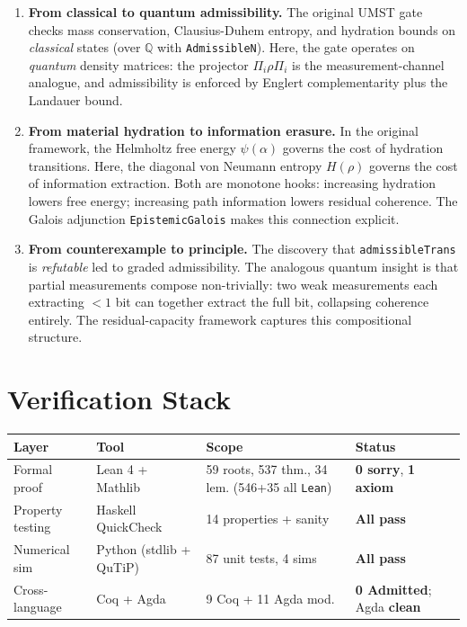 \documentclass[11pt, a4paper]{article}
\begin{document}
\begin{enumerate}
\item \textbf{From classical to quantum admissibility.} The original UMST gate checks mass conservation, Clausius-Duhem entropy, and hydration bounds on \emph{classical} states (over $\mathbb{Q}$ with \texttt{AdmissibleN}). Here, the gate operates on \emph{quantum} density matrices: the projector $\Pi_i \rho \Pi_i$ is the measurement-channel analogue, and admissibility is enforced by Englert complementarity plus the Landauer bound.

\item \textbf{From material hydration to information erasure.} In the original framework, the Helmholtz free energy $\psi(\alpha)$ governs the cost of hydration transitions. Here, the diagonal von Neumann entropy $H(\rho)$ governs the cost of information extraction. Both are monotone hooks: increasing hydration lowers free energy; increasing path information lowers residual coherence. The Galois adjunction \texttt{EpistemicGalois} makes this connection explicit.

\item \textbf{From counterexample to principle.} The discovery that \texttt{admissibleTrans} is \emph{refutable} led to graded admissibility. The analogous quantum insight is that partial measurements compose non-trivially: two weak measurements each extracting $< 1$ bit can together extract the full bit, collapsing coherence entirely. The residual-capacity framework captures this compositional structure.
\end{enumerate}

\section{Verification Stack}

\vspace{0.2em}
{\small
\begin{tabular}{@{}llll@{}}
\toprule
\textbf{Layer} & \textbf{Tool} & \textbf{Scope} & \textbf{Status} \\
\midrule
Formal proof & Lean 4 + Mathlib & 59 roots, 537 thm., 34 lem. (546+35 all \texttt{Lean}) & \textbf{0 sorry}, \textbf{1 axiom} \\
Property testing & Haskell QuickCheck & 14 properties + sanity & \textbf{All pass} \\
Numerical sim & Python (stdlib + QuTiP) & 87 unit tests, 4 sims & \textbf{All pass} \\
Cross-language & Coq + Agda & 9 Coq + 11 Agda mod. & \textbf{0 Admitted}; Agda \textbf{clean} \\
\bottomrule
\end{tabular}}
\end{document}
